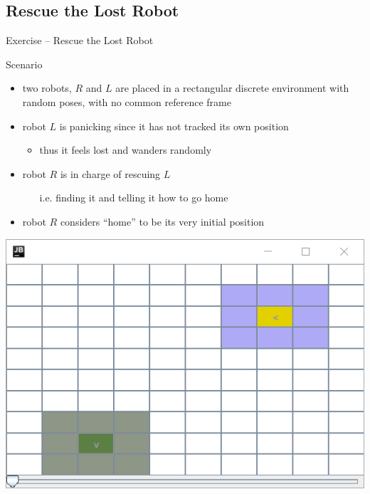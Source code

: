 \documentclass[presentation]{beamer}\mode<presentation>{\usetheme{AMSBolognaFC}}
\begin{document}
\subsection{Rescue the Lost Robot}

\startExercise
\begin{frame}[c, allowframebreaks]{Exercise \currentExercise{} -- Rescue the Lost Robot}
    
    \begin{block}{Scenario}
        \begin{itemize}
            \item two robots, $R$ and $L$ are placed in a rectangular discrete environment with random poses, with no common reference frame
            
            \item robot $L$ is panicking since it has not tracked its own position
            \begin{itemize}
                \item thus it feels lost and wanders randomly
            \end{itemize}
            
            \item robot $R$ is in charge of rescuing $L$
            \begin{itemize}
                \item[i.e.] finding it and telling it how to go home
            \end{itemize}
            
            \item robot $R$ considers ``home'' to be its very initial position
            
        \end{itemize}
    \end{block}

    \begin{center}
        \includegraphics[width=.8\linewidth]{figures/robots.png}
    \end{center}


\end{frame}
\end{document}
